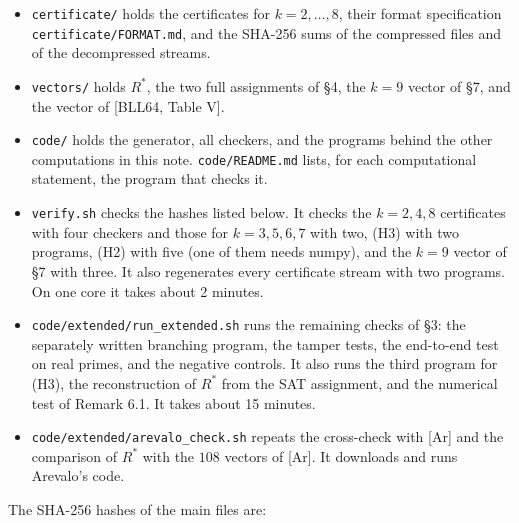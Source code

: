 \documentclass[
]{amsart}
\providecommand{\tightlist}{%
  \setlength{\itemsep}{0pt}\setlength{\parskip}{0pt}}
\begin{document}
\begin{itemize}
\tightlist
\item
  \texttt{certificate/} holds the certificates for \(k=2,\dots,8\),
  their format specification \texttt{certificate/FORMAT.md}, and the
  SHA-256 sums of the compressed files and of the decompressed streams.
\item
  \texttt{vectors/} holds \(R^*\), the two full assignments of §4, the
  \(k=9\) vector of §7, and the vector of {[}BLL64, Table V{]}.
\item
  \texttt{code/} holds the generator, all checkers, and the programs
  behind the other computations in this note. \texttt{code/README.md}
  lists, for each computational statement, the program that checks it.
\item
  \texttt{verify.sh} checks the hashes listed below. It checks the
  \(k=2,4,8\) certificates with four checkers and those for
  \(k=3,5,6,7\) with two, (H3) with two programs, (H2) with five (one of
  them needs numpy), and the \(k=9\) vector of §7 with three. It also
  regenerates every certificate stream with two programs. On one core it
  takes about 2 minutes.
\item
  \texttt{code/extended/run\_extended.sh} runs the remaining checks of
  §3: the separately written branching program, the tamper tests, the
  end-to-end test on real primes, and the negative controls. It also
  runs the third program for (H3), the reconstruction of \(R^*\) from
  the SAT assignment, and the numerical test of Remark 6.1. It takes
  about 15 minutes.
\item
  \texttt{code/extended/arevalo\_check.sh} repeats the cross-check with
  {[}Ar{]} and the comparison of \(R^*\) with the \(108\) vectors of
  {[}Ar{]}. It downloads and runs Arevalo's code.
\end{itemize}

The SHA-256 hashes of the main files are:
\end{document}
